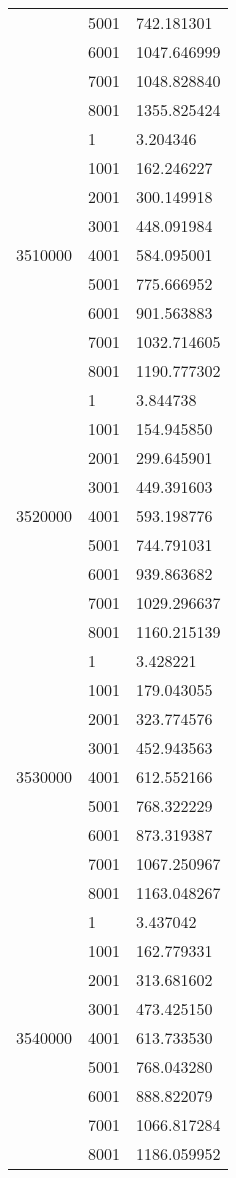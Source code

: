 \begin{table}[htb!]
\begin{tabular}{lll}
 & 5001 & 742.181301 \\
 & 6001 & 1047.646999 \\
 & 7001 & 1048.828840 \\
 & 8001 & 1355.825424 \\
\multirow[c]{9}{*}{3510000} & 1 & 3.204346 \\
 & 1001 & 162.246227 \\
 & 2001 & 300.149918 \\
 & 3001 & 448.091984 \\
 & 4001 & 584.095001 \\
 & 5001 & 775.666952 \\
 & 6001 & 901.563883 \\
 & 7001 & 1032.714605 \\
 & 8001 & 1190.777302 \\
\multirow[c]{9}{*}{3520000} & 1 & 3.844738 \\
 & 1001 & 154.945850 \\
 & 2001 & 299.645901 \\
 & 3001 & 449.391603 \\
 & 4001 & 593.198776 \\
 & 5001 & 744.791031 \\
 & 6001 & 939.863682 \\
 & 7001 & 1029.296637 \\
 & 8001 & 1160.215139 \\
\multirow[c]{9}{*}{3530000} & 1 & 3.428221 \\
 & 1001 & 179.043055 \\
 & 2001 & 323.774576 \\
 & 3001 & 452.943563 \\
 & 4001 & 612.552166 \\
 & 5001 & 768.322229 \\
 & 6001 & 873.319387 \\
 & 7001 & 1067.250967 \\
 & 8001 & 1163.048267 \\
\multirow[c]{9}{*}{3540000} & 1 & 3.437042 \\
 & 1001 & 162.779331 \\
 & 2001 & 313.681602 \\
 & 3001 & 473.425150 \\
 & 4001 & 613.733530 \\
 & 5001 & 768.043280 \\
 & 6001 & 888.822079 \\
 & 7001 & 1066.817284 \\
 & 8001 & 1186.059952 \\

\end{tabular}
\end{table}
